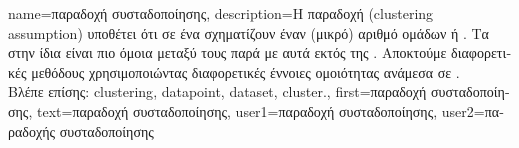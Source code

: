 {name={\foreignlanguage{greek}{παραδοχή συσταδοποίησης}}, 
	description={\foreignlanguage{greek}{Η παραδοχή} 
		 (clustering assumption) \foreignlanguage{greek}{υποθέτει ότι}  
		\foreignlanguage{greek}{σε ένα}  \foreignlanguage{greek}{σχηματίζουν έναν (μικρό) αριθμό ομάδων ή} 
		. \foreignlanguage{greek}{Τα}  \foreignlanguage{greek}{στην ίδια}  
		\foreignlanguage{greek}{είναι πιο όμοια μεταξύ τους παρά με αυτά εκτός της}  
		\cite{SemiSupervisedBook}. \foreignlanguage{greek}{Αποκτούμε διαφορετικές μεθόδους}  
		\foreignlanguage{greek}{χρησιμοποιώντας διαφορετικές έννοιες ομοιότητας ανάμεσα σε} .
		\\
		\foreignlanguage{greek}{Βλέπε επίσης:} \gls{clustering}, \gls{datapoint}, \gls{dataset}, \gls{cluster}.},
	first={\foreignlanguage{greek}{παραδοχή συσταδοποίησης}},
	text={\foreignlanguage{greek}{παραδοχή συσταδοποίησης}},
	user1={\foreignlanguage{greek}{παραδοχή συσταδοποίησης}}, %
	user2={\foreignlanguage{greek}{παραδοχής συσταδοποίησης}} %
}


